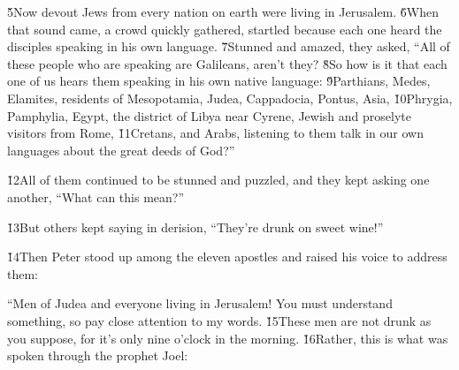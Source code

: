 \v{5}Now devout Jews from every nation on earth were living in Jerusalem. \v{6}When that sound came, a crowd quickly gathered, startled because each one heard the disciples speaking in his own language. \v{7}Stunned and amazed, they asked, ``All of these people who are speaking are Galileans, aren't they? \v{8}So how is it that each one of us hears them speaking in his own native language: \v{9}Parthians, Medes, Elamites, residents of Mesopotamia, Judea, Cappadocia, Pontus, Asia, \v{10}Phrygia, Pamphylia, Egypt, the district of Libya near Cyrene, Jewish and proselyte visitors from Rome, \v{11}Cretans, and Arabs, listening to them talk in our own languages about the great deeds of God?''

\v{12}All of them continued to be stunned and puzzled, and they kept asking one another, ``What can this mean?''

\v{13}But others kept saying in derision, ``They're drunk on sweet wine!''

\v{14}Then Peter stood up among the eleven apostles and raised his voice to address them:

``Men of Judea and everyone living in Jerusalem! You must understand something, so pay close attention to my words. \v{15}These men are not drunk as you suppose, for it's only nine o'clock in the morning. \v{16}Rather, this is what was spoken through the prophet Joel:

